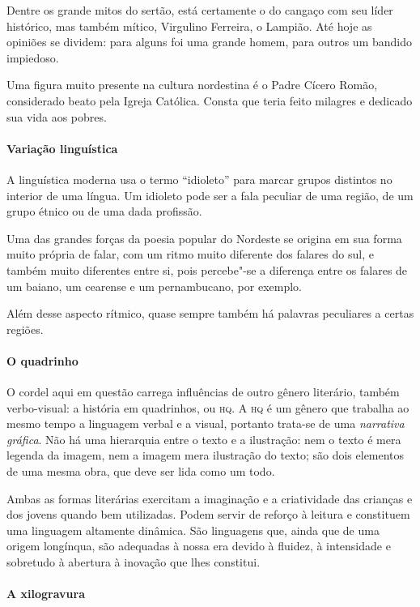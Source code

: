 \documentclass[11pt]{extarticle}
\begin{document}
Dentre os grande mitos do sertão, está certamente o do cangaço com seu líder
histórico, mas também mítico, Virgulino Ferreira, o Lampião. Até hoje as
opiniões se dividem: para alguns foi uma grande homem, para outros um bandido
impiedoso. 

Uma figura muito presente na cultura nordestina é o Padre Cícero Romão,
considerado beato pela Igreja Católica. Consta que teria feito milagres e
dedicado sua vida aos pobres. 

\paragraph{Variação linguística}

A linguística moderna usa o termo “idioleto” para marcar grupos distintos no
interior de uma língua. Um idioleto pode ser a fala peculiar de uma região, de
um grupo étnico ou de uma dada profissão. 

Uma das grandes forças da poesia popular do Nordeste se origina em sua forma
muito própria de falar, com um ritmo muito diferente dos falares do sul, e
também muito diferentes entre si, pois percebe"-se a diferença entre os falares
de um baiano, um cearense e um pernambucano, por exemplo.

Além desse aspecto rítmico, quase sempre também há palavras peculiares a certas
regiões.

\paragraph{O quadrinho}

O cordel aqui em questão carrega influências de outro gênero literário, também
verbo-visual: a história em quadrinhos, ou \textsc{hq}. A \textsc{hq} é um 
gênero que trabalha ao mesmo tempo a linguagem verbal e a visual, portanto trata-se de 
uma \textit{narrativa gráfica}. Não há uma hierarquia entre o texto e a ilustração: nem 
o texto é mera legenda da imagem, nem a imagem mera ilustração do texto; são dois elementos 
de uma mesma obra, que deve ser lida como um todo.

Ambas as formas literárias exercitam a imaginação e a criatividade das crianças e dos jovens quando bem utilizadas. Podem servir de reforço à leitura e constituem uma linguagem altamente dinâmica.  São linguagens que, ainda que de uma origem longínqua, são adequadas à nossa era devido à fluidez, à intensidade e sobretudo à abertura à inovação que lhes constitui.

\paragraph{A xilogravura}
\end{document}
